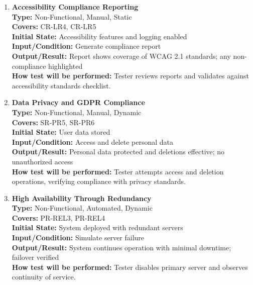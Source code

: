 \documentclass[12pt, titlepage]{article}
\begin{document}
\begin{enumerate}[label=NFR-ST \arabic*., wide=0pt, leftmargin=*]
  \item \textbf{Accessibility Compliance Reporting} \\[2mm]
    \textbf{Type:} Non-Functional, Manual, Static \\
    \textbf{Covers:} CR-LR4, CR-LR5 \\
    \textbf{Initial State:} Accessibility features and logging enabled \\
    \textbf{Input/Condition:} Generate compliance report \\
    \textbf{Output/Result:} Report shows coverage of WCAG 2.1
    standards; any non-compliance highlighted \\[2mm]
    \textbf{How test will be performed:} Tester reviews reports and
    validates against accessibility standards checklist.

  \item \textbf{Data Privacy and GDPR Compliance} \\[2mm]
    \textbf{Type:} Non-Functional, Manual, Dynamic \\
    \textbf{Covers:} SR-PR5, SR-PR6 \\
    \textbf{Initial State:} User data stored \\
    \textbf{Input/Condition:} Access and delete personal data \\
    \textbf{Output/Result:} Personal data protected and deletions
    effective; no unauthorized access \\[2mm]
    \textbf{How test will be performed:} Tester attempts access and
    deletion operations, verifying compliance with privacy standards.

  \item \textbf{High Availability Through Redundancy} \\[2mm]
    \textbf{Type:} Non-Functional, Automated, Dynamic \\
    \textbf{Covers:} PR-REL3, PR-REL4 \\
    \textbf{Initial State:} System deployed with redundant servers \\
    \textbf{Input/Condition:} Simulate server failure \\
    \textbf{Output/Result:} System continues operation with minimal
    downtime; failover verified \\[2mm]
    \textbf{How test will be performed:} Tester disables primary
    server and observes continuity of service.


\end{enumerate}
\end{document}
